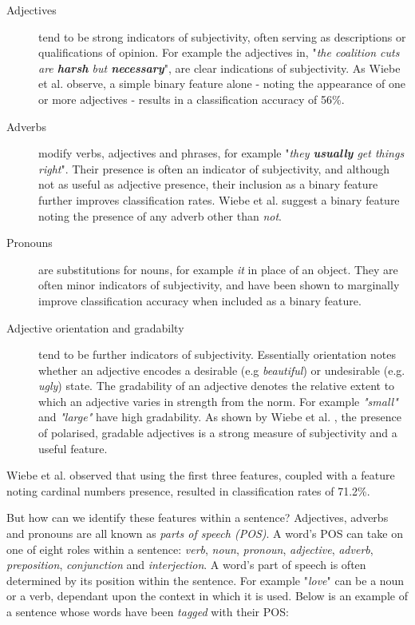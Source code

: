\begin{description}
	
	\item [Adjectives] tend to be strong indicators of subjectivity, often serving as descriptions or qualifications of opinion. For example the adjectives in, "\emph{the coalition cuts are \textbf{harsh} but \textbf{necessary}}", are clear indications of subjectivity. As Wiebe et al. \cite{Wiebe:1999cj} observe, a simple binary feature alone - noting the appearance of one or more adjectives - results in a classification accuracy of 56\%. 
	
	\item [Adverbs] modify verbs, adjectives and phrases, for example "\emph{they \textbf{usually} get things right}". Their presence is often an indicator of subjectivity, and although not as useful as adjective presence, their inclusion as a binary feature further improves classification rates. Wiebe et al. \cite{Wiebe:1999cj} suggest a binary feature noting the presence of any adverb other than \emph{not}.
	
	\item [Pronouns] are substitutions for nouns, for example \emph{it} in place of an object. They are often minor indicators of subjectivity, and have been shown to marginally improve classification accuracy when included as a binary feature.
		
	\item [Adjective orientation and gradabilty] tend to be further indicators of subjectivity. Essentially orientation notes whether an adjective encodes a desirable (e.g \emph{beautiful}) or undesirable (e.g. \emph{ugly}) state. The gradability of an adjective denotes the relative extent to which an adjective varies in strength from the norm. For example \emph{"small"} and \emph{"large"} have high gradability. As shown by Wiebe et al. \cite{Wiebe:2000tk}, the presence of polarised, gradable adjectives is a strong measure of subjectivity and a useful feature.
	
\end{description}

Wiebe et al. \cite{Wiebe:1999cj} observed that using the first three features, coupled with a feature noting cardinal numbers presence, resulted in classification rates of 71.2\%. 

But how can we identify these features within a sentence? Adjectives, adverbs and pronouns are all known as \emph{parts of speech (POS)}. A word's POS can take on one of eight roles within a sentence: \emph{verb}, \emph{noun}, \emph{pronoun}, \emph{adjective}, \emph{adverb}, \emph{preposition}, \emph{conjunction} and \emph{interjection}. A word's part of speech is often determined by its position within the sentence. For example "\emph{love}" can be a noun or a verb, dependant upon the context in which it is used. Below is an example of a sentence whose words have been \emph{tagged} with their POS:

